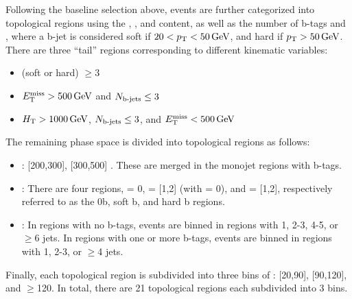 Following the baseline selection above, events are further categorized into topological regions using the \HT, \MET, and \nj content, as well as the number of b-tags \nbsoft and \nbhard, where a b-jet is considered soft if $20 < p_{\mathrm{T}} < 50\,\text{Ge\hspace{-.08em}V}$, and hard if $p_{\mathrm{T}} > 50\,\text{Ge\hspace{-.08em}V}$. There are three ``tail'' regions corresponding to different kinematic variables:
\begin{itemize}
	\item \nb (soft or hard) $\geq 3$
	\item $E_{\mathrm{T}}^{\text{miss}} > 500\,\text{Ge\hspace{-.08em}V}$ and $N_{\text{b-jets}} \leq 3$
	\item $H_{\mathrm{T}} > 1000\,\text{Ge\hspace{-.08em}V}$, $N_{\text{b-jets}} \leq 3$, and $E_{\mathrm{T}}^{\text{miss}} < 500\,\text{Ge\hspace{-.08em}V}$
\end{itemize}
The remaining phase space is divided into topological regions as follows:
\begin{itemize}
	\item \MET : [200,300], [300,500] \GeV. These are merged in the monojet regions with b-tags.
	\item \nb : There are four \nb regions, \nb = 0, \nbsoft = [1,2] (with \nbhard = 0), and \nbhard = [1,2], respectively referred to as the 0b, soft b, and hard b regions.
	\item \nj : In regions with no b-tags, events are binned in regions with 1, 2-3, 4-5, or $\geq$6 jets. In regions with one or more b-tags, events are binned in regions with 1, 2-3, or $\geq$4 jets.
\end{itemize}
Finally, each topological region is subdivided into three bins of \mt: [20,90], [90,120], and $\geq$120\GeV. In total, there are 21 topological regions each subdivided into 3 \mt bins.

